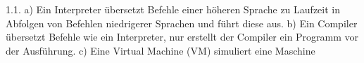 1.1. 
a) Ein Interpreter übersetzt Befehle einer höheren Sprache zu Laufzeit in Abfolgen von Befehlen niedrigerer Sprachen und führt diese aus.
b) Ein Compiler übersetzt Befehle wie ein Interpreter, nur erstellt der Compiler ein Programm vor der Ausführung.
c) Eine Virtual Machine (VM) simuliert eine Maschine

